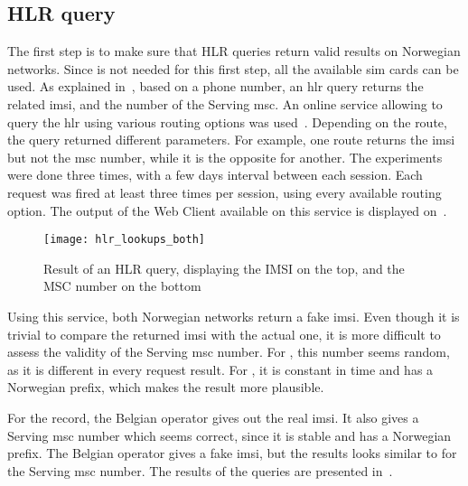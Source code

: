     \subsection{HLR query}

      The first step is to make sure that HLR queries return valid
      results on Norwegian networks. Since  is not
      needed for this first step, all the available \gls{sim} cards can
      be used. As explained in~, based on a phone
      number, an \gls{hlr} query returns the related \gls{imsi}, and the
      number of the Serving \gls{msc}. An online service allowing to
      query the \gls{hlr} using various routing options was
      used~\cite{hlr_lookup}. Depending on the route, the query returned
      different parameters. For example, one route returns the
      \gls{imsi} but not the \gls{msc} number, while it is the opposite
      for another. The experiments were done three times, with a few
      days interval between each session. Each request was fired at
      least three times per session, using every available routing
      option. The output of the Web Client available on this service is
      displayed on~.

      \begin{figure}
        \centering
        \texttt{[image: hlr\_lookups\_both]}
        \caption{Result of an HLR query, displaying the IMSI on the
        top, and the MSC number on the bottom~\cite{hlr_lookup}}
        \label{fig:hlr_lookup}
      \end{figure}
      
      Using this service, both Norwegian networks return a fake
      \gls{imsi}. Even though it is trivial to compare the returned
      \gls{imsi} with the actual one, it is more difficult to assess the
      validity of the Serving \gls{msc} number. For , this
      number seems random, as it is different in every request result.
      For , it is constant in time and has a Norwegian
      prefix, which makes the result more plausible. 
      
      For the record, the Belgian operator  gives out the
      real \gls{imsi}. It also gives a Serving \gls{msc} number which
      seems correct, since it is stable and has a Norwegian prefix. The
      Belgian operator  gives a fake \gls{imsi}, but the
      results looks similar to  for the Serving \gls{msc}
      number. The results of the queries are presented
      in~.

